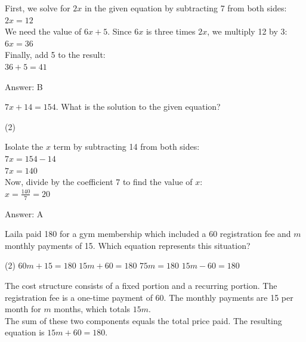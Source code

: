 \documentclass[11pt,paper=a4,answers]{exam}
\begin{document}
\begin{questions}
\begin{solution}
First, we solve for $2x$ in the given equation by subtracting 7 from both sides:
\\[10pt]
$2x = 12$ 
\\[10pt]
We need the value of $6x + 5$. Since $6x$ is three times $2x$, we multiply 12 by 3:
\\[10pt]
$6x = 36$ 
\\[10pt]
Finally, add 5 to the result:
\\[10pt]
$36 + 5 = 41$

\vspace{20pt}
Answer: \colorbox{yellow!100}{B}
\end{solution}

\question
$7x + 14 = 154$. What is the solution to the given equation?
\begin{tasks}(2)
\end{tasks}

\begin{solution}
Isolate the $x$ term by subtracting 14 from both sides:
\\[10pt]
$7x = 154 - 14$ \\
$7x = 140$ 
\\[10pt]
Now, divide by the coefficient 7 to find the value of $x$:
\\[10pt]
$x = \frac{140}{7} = 20$

\vspace{20pt}
Answer: \colorbox{yellow!100}{A}
\end{solution}

\question
Laila paid 180 for a gym membership which included a 60 registration fee and $m$ monthly payments of 15. Which equation represents this situation?
\begin{tasks}(2)
    \task $60m + 15 = 180$
    \task $15m + 60 = 180$
    \task $75m = 180$
    \task $15m - 60 = 180$
\end{tasks}

\begin{solution}
The cost structure consists of a fixed portion and a recurring portion. The registration fee is a one-time payment of 60. The monthly payments are 15 per month for $m$ months, which totals $15m$. 
\\[10pt]
The sum of these two components equals the total price paid. The resulting equation is $15m + 60 = 180$.


\end{solution}
\end{questions}
\end{document}
